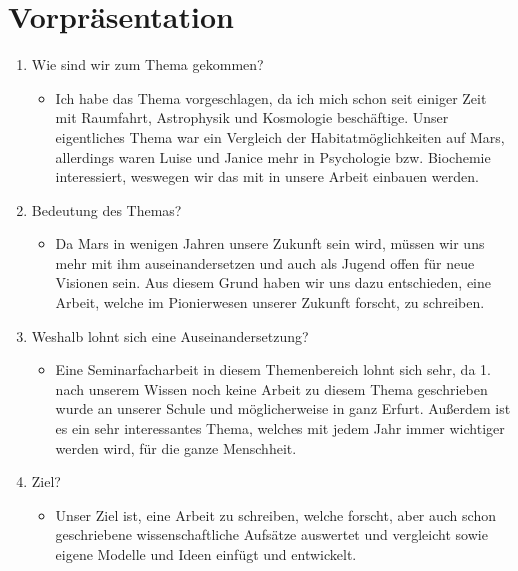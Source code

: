 \documentclass[12pt]{article}
\begin{document}
\section{\textbf{Vorpräsentation}}
\begin{enumerate}
  \item Wie sind wir zum Thema gekommen?
  \begin{itemize}
    \item Ich habe das Thema vorgeschlagen, da ich mich schon seit einiger Zeit mit Raumfahrt, Astrophysik und Kosmologie beschäftige. Unser eigentliches Thema war ein Vergleich der Habitatmöglichkeiten auf Mars, allerdings waren Luise und Janice mehr in Psychologie bzw. Biochemie interessiert, weswegen wir das mit in unsere Arbeit einbauen werden.
  \end{itemize}
  \item Bedeutung des Themas?
  \begin{itemize}
    \item Da Mars in wenigen Jahren unsere Zukunft sein wird, müssen wir uns mehr mit ihm auseinandersetzen und auch als Jugend offen für neue Visionen sein. Aus diesem Grund haben wir uns dazu entschieden, eine Arbeit, welche im Pionierwesen unserer Zukunft forscht, zu schreiben.
  \end{itemize}
  \item Weshalb lohnt sich eine Auseinandersetzung?
  \begin{itemize}
    \item Eine Seminarfacharbeit in diesem Themenbereich lohnt sich sehr, da 1. nach unserem Wissen noch keine Arbeit zu diesem Thema geschrieben wurde an unserer Schule und möglicherweise in ganz Erfurt. Außerdem ist es ein sehr interessantes Thema, welches mit jedem Jahr immer wichtiger werden wird, für die ganze Menschheit.
  \end{itemize}
  \item Ziel?
  \begin{itemize}
    \item Unser Ziel ist, eine Arbeit zu schreiben, welche forscht, aber auch schon geschriebene wissenschaftliche Aufsätze auswertet und vergleicht sowie eigene Modelle und Ideen einfügt und entwickelt.
  \end{itemize}
\end{enumerate}

\medskip
\end{document}
